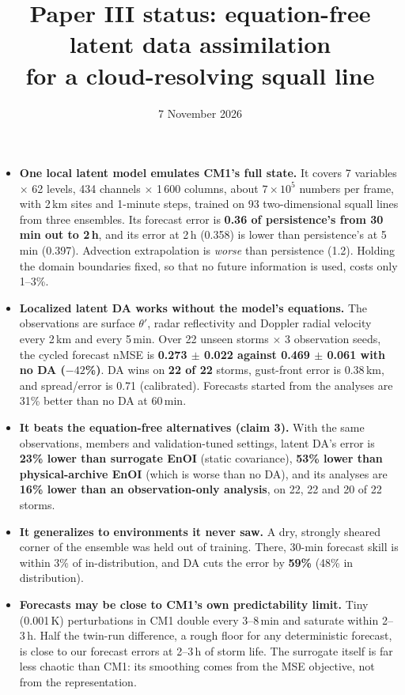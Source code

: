 \documentclass[11pt]{article}
\title{Paper III status: equation-free latent data assimilation\\for a cloud-resolving squall line}
\author{} %
\date{7 November 2026}
\begin{document}
\maketitle

\begin{tcolorbox}[colback=blue!3,colframe=blue!40!black,title=Headline results (all on storms the model never saw)]
\begin{itemize}
\item \textbf{One local latent model emulates CM1's full state.} It covers 7 variables $\times$ 62 levels, 434 channels $\times$ 1\,600 columns, about $7\times10^5$ numbers per frame, with 2\,km sites and 1-minute steps, trained on 93 two-dimensional squall lines from three ensembles. Its forecast error is \textbf{0.36 of persistence's from 30\,min out to 2\,h}, and its error at 2\,h (0.358) is lower than persistence's at 5\,min (0.397). Advection extrapolation is \emph{worse} than persistence (1.2). Holding the domain boundaries fixed, so that no future information is used, costs only 1--3\%.
\item \textbf{Localized latent DA works without the model's equations.} The observations are surface $\theta'$, radar reflectivity and Doppler radial velocity every 2\,km and every 5\,min. Over 22 unseen storms $\times$ 3 observation seeds, the cycled forecast nMSE is \textbf{0.273 $\pm$ 0.022 against 0.469 $\pm$ 0.061 with no DA ($-42$\%)}. DA wins on \textbf{22 of 22} storms, gust-front error is 0.38\,km, and spread/error is 0.71 (calibrated). Forecasts started from the analyses are 31\% better than no DA at 60\,min.
\item \textbf{It beats the equation-free alternatives (claim 3).} With the same observations, members and validation-tuned settings, latent DA's error is \textbf{23\% lower than surrogate EnOI} (static covariance), \textbf{53\% lower than physical-archive EnOI} (which is worse than no DA), and its analyses are \textbf{16\% lower than an observation-only analysis}, on 22, 22 and 20 of 22 storms.
\item \textbf{It generalizes to environments it never saw.} A dry, strongly sheared corner of the ensemble was held out of training. There, 30-min forecast skill is within 3\% of in-distribution, and DA cuts the error by \textbf{59\%} (48\% in distribution).
\item \textbf{Forecasts may be close to CM1's own predictability limit.} Tiny (0.001\,K) perturbations in CM1 double every 3--8\,min and saturate within 2--3\,h. Half the twin-run difference, a rough floor for any deterministic forecast, is close to our forecast errors at 2--3\,h of storm life. The surrogate itself is far less chaotic than CM1: its smoothing comes from the MSE objective, not from the representation.

\end{itemize}
\end{tcolorbox}
\end{document}
